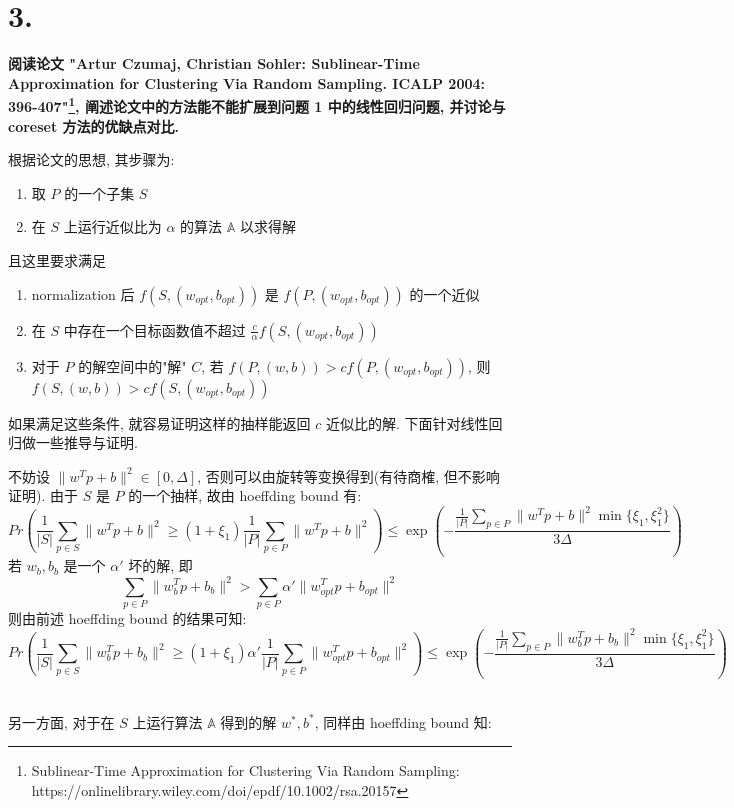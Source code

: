 \documentclass[UTF8]{article}
\newcommand{\jumpLine} {\hspace*{\fill} \par}
\begin{document}
\newpage
\section*{3.}
\textbf{阅读论文 "Artur Czumaj, Christian Sohler: Sublinear-Time Approximation for Clustering Via Random Sampling. ICALP 2004: 396-407"\footnote{Sublinear-Time Approximation for Clustering Via Random Sampling: https://onlinelibrary.wiley.com/doi/epdf/10.1002/rsa.20157}, 阐述论文中的方法能不能扩展到问题 1 中的线性回归问题, 并讨论与 coreset 方法的优缺点对比.}
\\\jumpLine\noindent
根据论文的思想, 其步骤为:
\begin{enumerate}
	\item 取 $P$ 的一个子集 $S$
	\item 在 $S$ 上运行近似比为 $\alpha$ 的算法 $\mathbb{A}$ 以求得解
\end{enumerate}
且这里要求满足
\begin{enumerate}
	\item normalization 后 $f(S, (w_{opt}, b_{opt}))$ 是 $f(P, (w_{opt}, b_{opt}))$ 的一个近似
	\item 在 $S$ 中存在一个目标函数值不超过 $\frac{c}{\alpha}f(S, (w_{opt}, b_{opt}))$
	\item 对于 $P$ 的解空间中的"解" $C$, 若 $f(P, (w, b)) > cf(P, (w_{opt}, b_{opt}))$, 则 $f(S, (w, b)) > c f(S, (w_{opt}, b_{opt}))$
\end{enumerate}
如果满足这些条件, 就容易证明这样的抽样能返回 $c$ 近似比的解. 下面针对线性回归做一些推导与证明.
\\\jumpLine\noindent
不妨设 $\|w^Tp+b\|^2 \in [0, \Delta]$, 否则可以由旋转等变换得到(有待商榷, 但不影响证明). 由于 $S$ 是 $P$ 的一个抽样, 故由 hoeffding bound 有:
$$Pr\left(\frac{1}{|S|}\sum\limits_{p\in S}\|w^Tp + b\|^2 \ge (1+\xi_1)\frac{1}{|P|}\sum\limits_{p\in P}\|w^Tp + b\|^2 \right) \le \exp\left( -\frac{\frac{1}{|P|}\sum\limits_{p\in P}\|w^Tp + b\|^2 \min\{\xi_1, \xi_1^2\}}{3\Delta} \right)$$
若 $w_b, b_b$ 是一个 $\alpha'$ 坏的解, 即
$$\sum\limits_{p\in P}\|w_b^Tp+b_b\|^2 > \sum\limits_{p\in P}\alpha'\|w_{opt}^Tp+b_{opt}\|^2$$
则由前述 hoeffding bound 的结果可知:
$$Pr\left(\frac{1}{|S|}\sum\limits_{p\in S}\|w_b^Tp + b_b\|^2 \ge (1+\xi_1)\alpha'\frac{1}{|P|}\sum\limits_{p\in P}\|w_{opt}^Tp + b_{opt}\|^2 \right) \le \exp\left( -\frac{\frac{1}{|P|}\sum\limits_{p\in P}\|w_{b}^Tp + b_{b}\|^2 \min\{\xi_1, \xi_1^2\}}{3\Delta} \right)$$
\\\jumpLine\noindent
另一方面, 对于在 $S$ 上运行算法 $\mathbb{A}$ 得到的解 $w^*, b^*$, 同样由 hoeffding bound 知:
\end{document}
